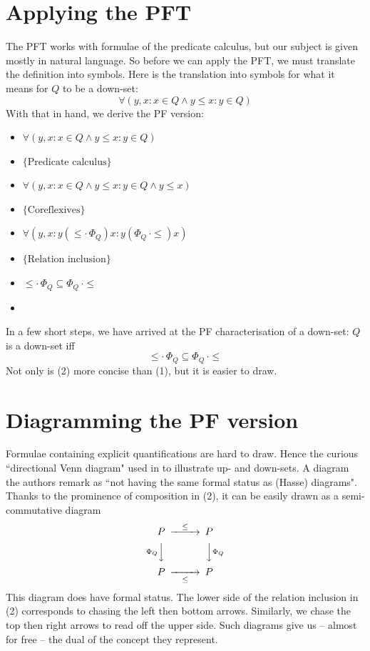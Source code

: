 \documentclass{article}
\begin{document}
\section{Applying the PFT}
The PFT works with formulae of the predicate calculus, but our subject is given mostly in natural language.  So before we can apply the PFT, we must translate the definition into symbols.  Here is the translation into symbols for what it means for $Q$ to be a down-set:
\begin{equation}
    \forall(y,x : x \in Q \wedge y \leq x : y \in Q)
\end{equation}
With that in hand, we derive the PF version:
\begin{itemize}
    \item $\forall(y,x : x \in Q \wedge y \leq x : y \in Q)$
    \item[$\equiv$] $\{\text{Predicate calculus}\}$
    \item[] $\forall(y,x : x \in Q \wedge y \leq x : y \in Q \wedge y \leq x)$
    \item[$\equiv$] $\{\text{Coreflexives}\}$
    \item[] $\forall(y,x : y(\leq \cdot \, \Phi_{Q})x : y(\Phi_{Q} \, \cdot \leq )x )$
    \item[$\equiv$] $\{\text{Relation inclusion}\}$
    \item[] $\leq \cdot \, \Phi_{Q} \subseteq \Phi_{Q} \, \cdot \leq $
    \item[\Heart]
\end{itemize}
In a few short steps, we have arrived at the PF characterisation of a down-set: $Q$ is a down-set iff
\begin{equation}
    \leq \cdot \, \Phi_{Q} \subseteq \Phi_{Q} \, \cdot \leq
\end{equation}
Not only is (2) more concise than (1), but it is easier to draw.

\section{Diagramming the PF version}
Formulae containing explicit quantifications are hard to draw.  Hence the curious ``directional Venn diagram" used in \cite{davey_priestley_2002} to illustrate up- and down-sets. A diagram the authors remark as ``not having the same formal status as (Hasse) diagrams".  Thanks to the prominence of composition in (2), it can be easily drawn as a semi-commutative diagram
\begin{equation}
\begin{CD}
P  @>\leq>> P \\
@V\Phi_{Q}VV    @VV\Phi_{Q}V \\
P  @>>\leq> P
\end{CD}    
\end{equation}
This diagram does have formal status. The lower side of the relation inclusion in (2) corresponds to chasing the left then bottom arrows.  Similarly, we chase the top then right arrows to read off the upper side.  Such diagrams give us -- almost for free -- the dual of the concept they represent. 
\end{document}
